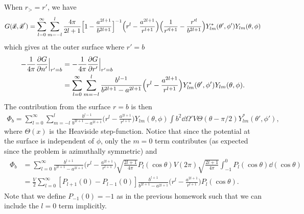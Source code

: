 {When $r_{>} = r'$, we have
\begin{eqnarray}
    G(\va*{x},\va*{x}') = \sum_{l=0}^{\infty} \sum_{m=-l}^{l} \frac{4 \pi}{2l+1} \Big[ 1 - \frac{a^{2l+1}}{b^{2l+1}} \Big]^{-1} \Big( r^{l} - \frac{a^{2l+1}}{r^{l+1}} \Big) \Big( \frac{1}{r'^{l+1}} - \frac{r'^{l}}{b^{2l+1}} \Big) Y_{lm}^{*}(\theta',\phi') Y_{lm}(\theta,\phi)
\end{eqnarray}
which gives at the outer surface where $r' = b$
\begin{eqnarray}
\begin{aligned}
    - \frac{1}{4\pi} \pdv{G}{n'}\Big|_{r'=b} &= -\frac{1}{4 \pi} \pdv{G}{r'}\Big|_{r'=b} \\
                                             &= \sum_{l=0}^{\infty} \sum_{m=-l}^{l} \frac{b^{l-1}}{b^{2l+1} - a^{2l+1}} \Big( r^{l} - \frac{a^{2l+1}}{r^{l+1}} \Big) Y_{lm}^{*}(\theta',\phi') Y_{lm}(\theta,\phi)
.\end{aligned}
\end{eqnarray}
The contribution from the surface $r = b$ is then
\begin{eqnarray}
    \Phi_{b} = \sum_{l=0}^{\infty} \sum_{m=-l}^{l} \frac{b^{l-1}}{b^{2l+1} - a^{2l+1}} \Big( r^{l} - \frac{a^{2l+1}}{r^{l+1}} \Big) Y_{lm}(\theta,\phi) \int b^2 \dd{\Omega'} V \Theta(\theta - \pi/2) Y^{*}_{lm}(\theta',\phi')
,\end{eqnarray}
where $\Theta(x)$ is the Heaviside step-function.
Notice that since the potential at the surface is independent of $\phi$, only the $m = 0$ term contributes (as expected since the problem is azimuthally symmetric) and
\begin{eqnarray}
\begin{aligned}
    \Phi_{b} &= \sum_{l=0}^{\infty} \frac{b^{l+1}}{b^{2l+1} - a^{2l+1}} \Big( r^{l} - \frac{a^{2l+1}}{r^{l+1}} \Big) \sqrt{ \frac{2l+1}{4\pi} } P_{l}(\cos{\theta}) V (2\pi) \sqrt{\frac{2l+1}{4 \pi}} \int_{-1}^{0} P_{l}(\cos{\theta}) \dd{(\cos{\theta})} \\
             &= \frac{V}{2} \sum_{l=0}^{\infty} [ P_{l+1}(0) - P_{l-1}(0) ] \frac{b^{l+1}}{b^{2l+1} - a^{2l+1}} \Big( r^{l} - \frac{a^{2l+1}}{r^{l+1}} \Big) P_{l}(\cos{\theta})
.\end{aligned}
\end{eqnarray}
Note that we define $P_{-1}(0) = -1$ as in the previous homework such that we can include the $l = 0$ term implicitly.

}
